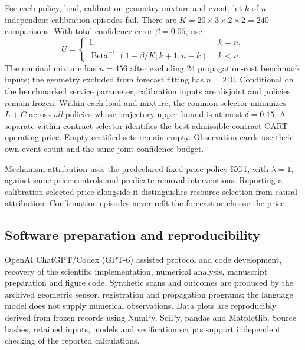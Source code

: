 For each policy, load, calibration geometry mixture and event, let $k$ of $n$ independent calibration episodes fail. There are $K=20\times3\times2\times2=240$ comparisons. With total confidence error $\beta=0.05$, use
\begin{equation}
U=\begin{cases}1,&k=n,\\
\operatorname{Beta}^{-1}(1-\beta/K;k+1,n-k),&k<n.
\end{cases}\label{eq:cp}
\end{equation}
The nominal mixture has $n=456$ after excluding 24 propagation-cost benchmark inputs; the geometry excluded from forecast fitting has $n=240$. Conditional on the benchmarked service parameter, calibration inputs are disjoint and policies remain frozen. Within each load and mixture, the common selector minimizes $\overline L+\overline C$ across \emph{all} policies whose trajectory upper bound is at most $\delta=0.15$. A separate within-contract selector identifies the best admissible contract-CART operating price. Empty certified sets remain empty. Observation cards use their own event count and the same joint confidence budget.

Mechanism attribution uses the predeclared fixed-price policy KG1, with $\lambda=1$, against same-price controls and predicate-removal interventions. Reporting a calibration-selected price alongside it distinguishes resource selection from causal attribution. Confirmation episodes never refit the forecast or choose the price.

\subsection{Software preparation and reproducibility}
OpenAI ChatGPT/Codex (GPT-6) assisted protocol and code development, recovery of the scientific implementation, numerical analysis, manuscript preparation and figure code. Synthetic scans and outcomes are produced by the archived geometric sensor, registration and propagation programs; the language model does not supply numerical observations. Data plots are reproducibly derived from frozen records using NumPy, SciPy, pandas and Matplotlib. Source hashes, retained inputs, models and verification scripts support independent checking of the reported calculations.
